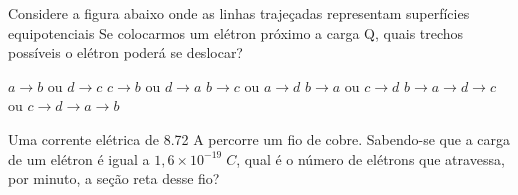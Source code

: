 \documentclass[12pt, addpoints]{exam}
\begin{document}
    \begin{questions}
\begin{multicols*}{2}
\question Considere a figura abaixo onde as linhas trajeçadas representam superfícies equipotenciais Se colocarmos um elétron próximo a carga Q, quais trechos possíveis o elétron poderá se deslocar?
        
        \begin{center}
            \begin{minipage}[c]{0.5\linewidth}
            \end{minipage}
        \end{center}
        
        

\begin{choices}
\choice $a\rightarrow b$ ou $d\rightarrow c$ 
\choice $c\rightarrow b$ ou $d\rightarrow a$ 
\choice $b\rightarrow c$ ou $a\rightarrow d$ 
\choice $b\rightarrow a$ ou $c\rightarrow d$ 
\choice $b\rightarrow a\rightarrow d\rightarrow c$ ou $c\rightarrow d\rightarrow a\rightarrow b$ 
\end{choices}
\question Uma corrente elétrica de    8.72 A percorre um ﬁo de cobre. Sabendo-se que a carga de um elétron é igual a $1,6\times 10^{-19}\;C$, qual é o número de elétrons que atravessa, por minuto, a seção reta desse ﬁo?


\end{multicols*}
\end{questions}
\end{document}
